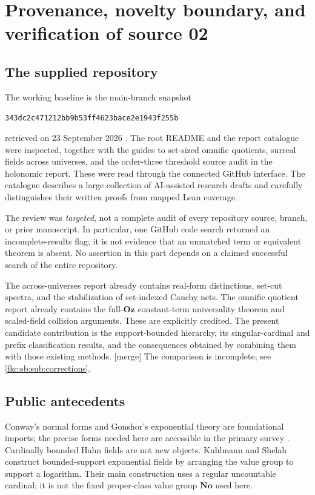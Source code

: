 \documentclass[11pt,letterpaper]{article}
\numberwithin{equation}{section}
\theoremstyle{definition}
\theoremstyle{remark}
\newcommand{\No}{\mathbf{No}}
\newcommand{\mergetag}{\textup{\textsf{\small[merge]}}}%
\newcommand{\Oz}{\mathbf{Oz}}
\begin{document}
\section{Provenance, novelty boundary, and verification of source 02}\label{fkc:sb:sec:provenance}

\subsection{The supplied repository}
The working baseline is the main-branch snapshot
\begin{center}\small\texttt{343dc2c471212bb9b53ff4623bace2e1943f255b}\end{center}
retrieved on 23 September 2026 \cite{RepoTwo}. The root README and the report catalogue were inspected, together with the guides to set-sized omnific quotients, surreal fields across universes, and the order-three threshold source audit in the holonomic report. These were read through the connected GitHub interface. The catalogue describes a large collection of AI-assisted research drafts and carefully distinguishes their written proofs from mapped Lean coverage.

The review was \emph{targeted}, not a complete audit of every repository source, branch, or prior manuscript. In particular, one GitHub code search returned an incomplete-results flag; it is not evidence that an unmatched term or equivalent theorem is absent. No assertion in this part depends on a claimed successful search of the entire repository.

The across-universes report already contains real-form distinctions, set-cut spectra, and the stabilization of set-indexed Cauchy nets. The omnific quotient report already contains the full-$\Oz$ constant-term universality theorem and scaled-field collision arguments. These are explicitly credited. The present candidate contribution is the support-bounded hierarchy, its singular-cardinal and prefix classification results, and the consequences obtained by combining them with those existing methods. \mergetag{} The comparison is incomplete; see \cref{fkc:sb:sub:corrections}.

\subsection{Public antecedents}
Conway's normal forms and Gonshor's exponential theory are foundational imports; the precise forms needed here are accessible in the primary survey \cite{MM}. Cardinally bounded Hahn fields are not new objects. Kuhlmann and Shelah \cite{KS} construct bounded-support exponential fields by arranging the value group to support a logarithm. Their main construction uses a regular uncountable cardinal; it is not the fixed proper-class value group $\No$ used here.
\end{document}
